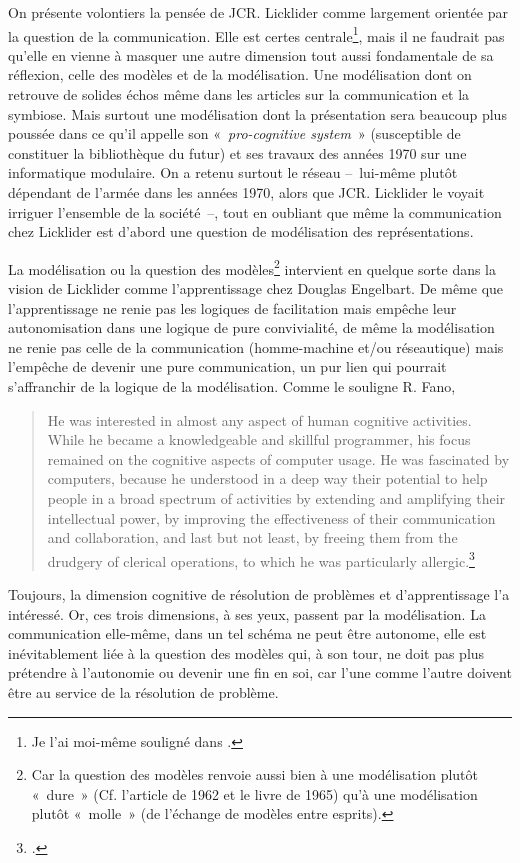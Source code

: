 \documentclass{FramateX}
\begin{document}
\begin{refsection}
On présente volontiers la pensée de JCR. Licklider comme largement
orientée par la question de la communication. Elle est certes
centrale\footnote{Je l'ai moi-même souligné dans \cite{robertjcr2011}.}, mais il ne faudrait pas qu'elle en vienne à masquer une autre
dimension tout aussi fondamentale de sa réflexion, celle des modèles
et de la modélisation. Une modélisation dont on retrouve de solides
échos même dans les articles sur la communication et la symbiose. Mais
surtout une modélisation dont la présentation sera beaucoup plus
poussée dans ce qu'il appelle son «~\textit{pro-cognitive system}~» (susceptible
de constituer la bibliothèque du futur) et ses travaux des années 1970
sur une informatique modulaire. On a retenu surtout le réseau --~lui-même
plutôt dépendant de l'armée dans les années 1970, alors que JCR.
Licklider le voyait irriguer l'ensemble de la société~--, tout en oubliant que même la communication chez Licklider est d'abord une question de modélisation des représentations.

La modélisation ou la question des modèles\footnote{Car la question des
modèles renvoie aussi bien à une modélisation plutôt «~dure~» (Cf.
l'article de 1962 et le livre de 1965) qu'à une modélisation plutôt
«~molle~» (de l'échange de modèles entre esprits).} intervient en
quelque sorte dans la vision de Licklider comme l'apprentissage
chez Douglas Engelbart. De même que l'apprentissage ne renie pas les
logiques de facilitation mais empêche leur autonomisation dans une
logique de pure convivialité, de même la modélisation ne renie pas
celle de la communication (homme-machine et/ou réseautique) mais
l'empêche de devenir une pure communication, un pur lien qui pourrait
s'affranchir de la logique de la modélisation. Comme le souligne R. Fano, 

\begin{quote}
He was interested in almost any aspect of human cognitive
activities. While he became a knowledgeable and skillful programmer,
his focus remained on the cognitive aspects of computer usage. He was
fascinated by computers, because he understood in a deep way their
potential to help people in a broad spectrum of activities by extending
and amplifying their intellectual power, by improving the effectiveness
of their communication and collaboration, and last but not least, by
freeing them from the drudgery of clerical operations, to which he was
particularly allergic.\footnote{\cite[p.~20]{fanojoseph1998}.}
\end{quote}

 Toujours, la
dimension cognitive de résolution de problèmes et d'apprentissage l'a intéressé. Or, ces trois dimensions, à ses yeux, passent par la
modélisation. La communication elle-même, dans un tel schéma ne peut
être autonome, elle est inévitablement liée à la question des modèles
qui, à son tour, ne doit pas plus prétendre à l'autonomie ou devenir
une fin en soi, car l'une comme l'autre doivent être au service de la
résolution de problème.





\end{refsection}
\end{document}
